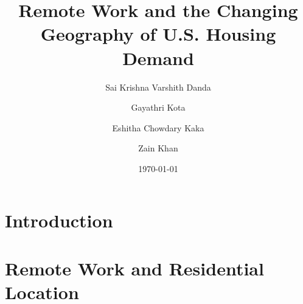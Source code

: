 \documentclass[11pt]{article}
\title{\textbf{Remote Work and the Changing Geography of U.S. Housing Demand}}
\author{
Sai Krishna Varshith Danda \and
Gayathri Kota \and
Eshitha Chowdary Kaka \and
Zain Khan
}
\date{\today}
\begin{document}
\maketitle

\section{Introduction}

%
%
%
%
%
%
%
%


\section{Remote Work and Residential Location}

%
%
%
%
%
\end{document}
